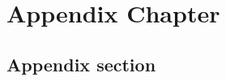 \chapter{Appendix Chapter}
\label{appendix:appendix_chapter}

\section{Appendix section}
\blindtext[1]
